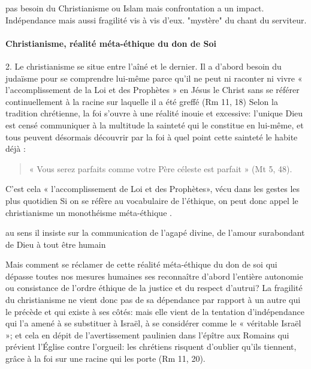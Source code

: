 pas besoin du Christianisme ou Islam mais confrontation a un impact. Indépendance mais aussi fragilité vis à vis d'eux. "mystère" du chant du serviteur.  

\paragraph{Christianisme, réalité méta-éthique du don de Soi  } 
2. Le christianisme se situe entre l'aîné et le dernier. Il a d'abord besoin du judaïsme pour se comprendre lui-même parce qu'il ne peut ni raconter ni vivre « l'accomplissement de la Loi et des Prophètes » en Jésus le Christ sans se référer continuellement à la racine sur laquelle il a été greffé (Rm 11, 18) Selon la tradition chrétienne, la foi s'ouvre à une réalité inouie et excessive: l'unique Dieu est censé communiquer à la multitude la sainteté qui le constitue en lui-même, et tous peuvent désormais découvrir par la foi à quel point cette sainteté le habite déjà :
\begin{quote}
    « Vous serez parfaits comme votre Père céleste est parfait » (Mt 5, 48).  
\end{quote}
C'est cela « l'accomplissement de Loi et des Prophètes», vécu dans les gestes les plus quotidien Si on se réfère au vocabulaire de l'éthique, on peut donc appel le christianisme un monothéisme méta-éthique .
\begin{Def}
    au sens il insiste sur la communication de l'agapé divine, de l'amour surabondant de Dieu à tout être humain
\end{Def}
 
Mais comment se réclamer de cette réalité méta-éthique du don de soi qui dépasse toutes nos mesures humaines ses reconnaître d'abord l'entière autonomie ou consistance de l'ordre éthique de la justice et du respect d'autrui? La fragilité du christianisme ne vient donc pas de sa dépendance par rapport à un autre qui le précède et qui existe à ses côtés: mais elle vient de la tentation d'indépendance qui l'a amené à se substituer à Israël, à se considérer comme le « véritable Israël »; et cela en dépit de l'avertissement paulinien dans l'épître aux Romains qui prévient l'Église contre l'orgueil: les chrétiens risquent d'oublier qu'ils tiennent, grâce à la foi sur une racine qui les porte (Rm 11, 20).

